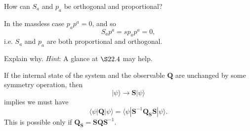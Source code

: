 \documentclass[../road-to-reality.tex]{subfiles}
\begin{document}
\begin{questions}
\question How can $S_a$ and $p_a$ be orthogonal and proportional?

\begin{solution}
	In the massless case $p_ap^a = 0$, and so
	\[
		S_ap^a = sp_ap^a = 0,
	\]
	i.e. $S_a$ and $p_a$ are both proportional and orthogonal.
\end{solution}

\question Explain why. \textit{Hint}: A glance at $\S 22.4$ may help.

\begin{solution}
	If the internal state of the system and the observable $\mathbf{Q}$ are unchanged by some symmetry operation, then
	\[
		|\psi\rangle \to \mathbf{S}|\psi\rangle
	\]
	implies we must have
	\[
		\langle\psi|\mathbf{Q}|\psi\rangle = \langle\psi|\mathbf{S}^{-1}\mathbf{Q}_{\mathbf{S}}\mathbf{S}|\psi\rangle.
	\]
	This is possible only if $\mathbf{Q}_\mathbf{S} = \mathbf{S}\mathbf{Q}\mathbf{S}^{-1}$.
\end{solution}

\end{questions}
	
\end{document}
